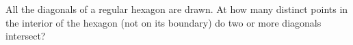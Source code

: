 All the diagonals of a regular hexagon are drawn. At how many distinct points in the interior of the hexagon (not on its boundary) do two or more diagonals intersect?

